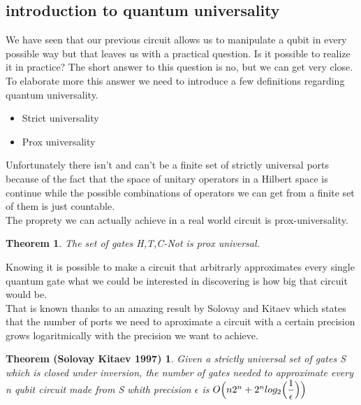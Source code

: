 \documentclass{article}
\newtheorem{Solovay-Kitaev}{Theorem (Solovay Kitaev 1997)}
\newtheorem{Prox-Universal-Set}{Theorem}
\begin{document}
\subsection{introduction to quantum universality}

We have seen that our previous circuit allows us to manipulate a qubit
in every possible way but that leaves us with a practical question.
Is it possible to realize it in practice?
The short answer to this question is no, but we can get very close.
To elaborate more this answer we need to introduce a few definitions
regarding quantum universality.
\begin{itemize}

\item
  Strict universality

\item
  Prox universality

\end{itemize}

Unfortunately there isn't and can't be a finite set of strictly
universal
ports because of the fact that the space of unitary operators in a
Hilbert space is continue while the possible combinations of
operators we can get from a finite set of them is just countable.\\
The proprety we can actually achieve in a real world circuit is
prox-universality.\\

\begin{Prox-Universal-Set}
The set of gates {H,T,C-Not} is prox universal.
\end{Prox-Universal-Set}

Knowing it is possible to make a circuit that arbitrarly approximates
every
single quantum gate what we could be interested in discovering is how
big that circuit would be.\\

That is known thanks to an amazing result by Solovay and Kitaev which
states
that the number of ports we need to aproximate a circuit with a certain
precision grows logaritmically with the precision we want to achieve.
  
\begin{Solovay-Kitaev}

  Given a strictly universal set of gates S which is closed under inversion,
  the number of gates needed to approximate every n qubit circuit made
  from S whith precision $\epsilon$ is
  $O\Bigl(n2^n+2^nlog_2 \Bigl( \dfrac{1}{\epsilon}\Bigl)\Bigl)$
  

\end{Solovay-Kitaev}
\end{document}
